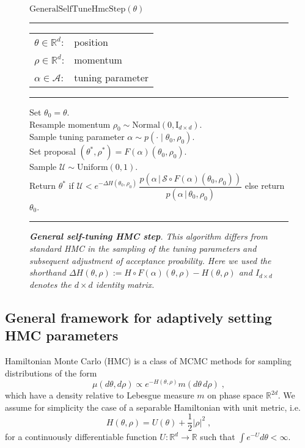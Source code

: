 \documentclass[ejs]{imsart}
\theoremstyle{plain}%
\theoremstyle{remark}
\begin{document}
\begin{figure}
\begin{flushleft}
$\textrm{GeneralSelfTuneHmcStep}(\theta)$
\vspace*{2pt}
\hrule
\vspace*{2pt}
\begin{tabular}{ll}
$\theta \in \mathbb{R}^d$: & position
\\
$\rho \in \mathbb{R}^d$: & momentum
\\
$\alpha \in \mathcal{A}$: & tuning parameter
\end{tabular}
\vspace*{4pt}
\hrule
\vspace*{8pt}
Set $\theta_0 = \theta$.
\\[4pt]
Resample momentum $\rho_0 \sim \textrm{Normal}(0, \textrm{I}_{d \times d}).$
\\[4pt]
Sample tuning parameter $\alpha \sim p(\cdot \mid \theta_0, \rho_0)$.
\\[4pt]
Set proposal $(\theta^*, \rho^*) = F(\alpha)(\theta_0, \rho_0)$.
\\[4pt]
Sample $\mathcal{U} \sim \textrm{Uniform}(0, 1)$.
\\[4pt]
Return $\theta^*$ 
if $\mathcal{U} < e^{-\Delta H(\theta_0,\rho_0)} \, \dfrac{p\left(\alpha \, | \, \mathcal{S} \circ F(\alpha)(\theta_0, \rho_0) \right)}{p \left(\alpha\, | \, \theta_0, \rho_0 \right)} $
else return $\theta_0$.
\vspace*{4pt}
\hrule
\caption{\it {\bfseries General self-tuning HMC step}.  This algorithm differs from standard HMC in the sampling of the tuning parameters and subsequent adjustment of acceptance proability.  Here we used the shorthand $\Delta H(\theta, \rho) := H \circ F(\alpha)(\theta,\rho) - H(\theta, \rho)$ and $I_{d \times d}$ denotes the $d \times d$ identity matrix.}
\label{fig:general-self-tuning-step}
\end{flushleft}
\end{figure}

\subsection{General framework for adaptively setting HMC parameters}

Hamiltonian Monte Carlo (HMC) is a class of MCMC methods for sampling distributions of the form \begin{equation} \label{eq:target}
\mu(d\theta, d\rho) \propto e^{-H(\theta,\rho)} m( d\theta \, d\rho) \;, 
\end{equation}
which have a density relative to Lebesgue measure $m$ on phase space $\mathbb{R}^{2d}$.  We assume for simplicity the case of a separable Hamiltonian with unit metric, i.e. \[
H(\theta,\rho) = U(\theta) + \frac{1}{2} \left|\rho\right|^2 \;, 
\]
for a continuously differentiable function $U: \mathbb{R}^d \to \mathbb{R}$ such that $\int e^{-U} d\theta < \infty$. 
\end{document}
